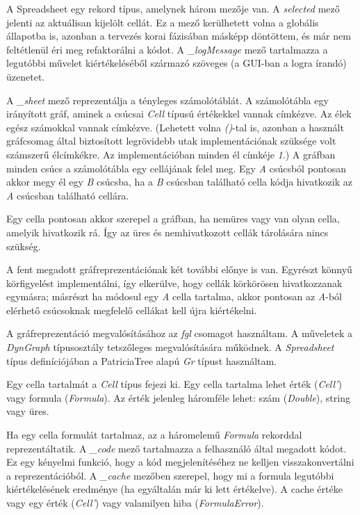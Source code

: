 A Spreadsheet egy rekord típus, amelynek három mezője van. A \textit{selected} mező jelenti az aktuálisan kijelölt cellát. Ez a mező kerülhetett volna a globális állapotba is, azonban a tervezés korai fázisában másképp döntöttem, és már nem feltétlenül éri meg refaktorálni a kódot. A \textit{\_logMessage} mező tartalmazza a legutóbbi művelet kiértékeléséből származó szöveges (a GUI-ban a logra írandó) üzenetet.

A \textit{\_sheet} mező reprezentálja a tényleges számolótáblát. A számolótábla egy irányított gráf, aminek a csúcsai \textit{Cell} típusú értékekkel vannak címkézve. Az élek egész számokkal vannak címkézve. (Lehetett volna \textit{()}-tal is, azonban a használt gráfcsomag által biztosított legrövidebb utak implementációnak szüksége volt számszerű élcímkékre. Az implementációban minden él címkéje \textit{1}.) A gráfban minden csúcs a számolótábla egy cellájának felel meg. Egy \textit{A} csúcsból pontosan akkor megy él egy \textit{B} csúcsba, ha a \textit{B} csúcsban található cella kódja hivatkozik az \textit{A} csúcsban található cellára. 

Egy cella pontosan akkor szerepel a gráfban, ha nemüres vagy van olyan cella, amelyik hivatkozik rá. Így az üres és nemhivatkozott cellák tárolására nincs szükség.

A fent megadott gráfreprezentációnak két további előnye is van. Egyrészt könnyű körfigyelést implementálni, így elkerülve, hogy cellák körkörösen hivatkozzanak egymásra; másrészt ha módosul egy \textit{A} cella tartalma, akkor pontosan az \textit{A}-ból elérhető csúcsoknak megfelelő cellákat kell újra kiértékelni.

A gráfreprezentáció megvalósításához az \textit{fgl} csomagot használtam. A műveletek a \textit{DynGraph} típusosztály tetszőleges megvalósítására működnek. A \textit{Spreadsheet} típus definíciójában a PatriciaTree alapú \textit{Gr} típust használtam.

Egy cella tartalmát a \textit{Cell} típus fejezi ki. Egy cella tartalma lehet érték (\textit{Cell'}) vagy formula (\textit{Formula}). Az érték jelenleg háromféle lehet: szám (\textit{Double}), string vagy üres.

Ha egy cella formulát tartalmaz, az a háromelemű \textit{Formula} rekorddal reprezentáltatik. A \textit{\_code} mező tartalmazza a felhasználó által megadott kódot. Ez egy kényelmi funkció, hogy a kód megjelenítéséhez ne kelljen visszakonvertálni a reprezentációból. A \textit{\_cache} mezőben szerepel, hogy mi a formula legutóbbi kiértékelésének eredménye (ha egyáltalán már ki lett értékelve). A cache értéke vagy egy érték (\textit{Cell'}) vagy valamilyen hiba (\textit{FormulaError}). 

